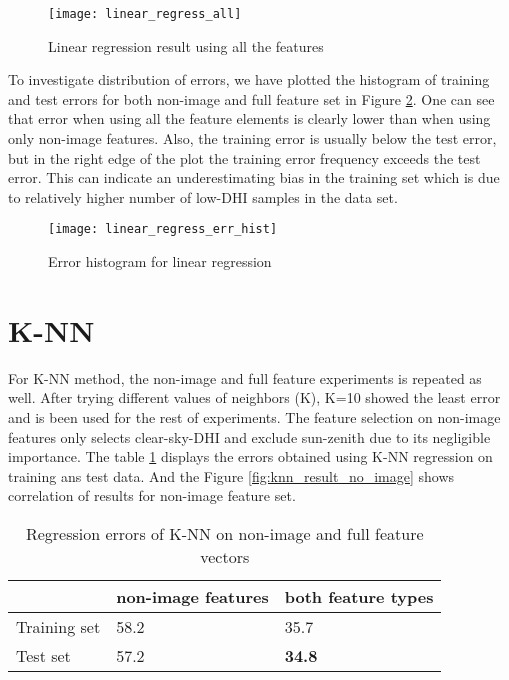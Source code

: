 \begin{figure}[h]
\caption{Linear regression result using all the features}
\label{fig:ln_result_all}
\texttt{[image: linear\_regress\_all]}
\centering
\end{figure}

To investigate distribution of errors, we have plotted the histogram of training and test errors for both non-image and full feature set in Figure \ref{fig:ln_result_hist}. One can see that error when using all the feature elements is clearly lower than when using only non-image features. Also, the training error is usually below the test error, but in the right edge of the plot the training error frequency exceeds the test error. This can indicate an underestimating bias in the training set which is due to relatively higher number of low-DHI samples in the data set.

\begin{figure}[h]
\caption{Error histogram for linear regression}
\label{fig:ln_result_hist}
\texttt{[image: linear\_regress\_err\_hist]}
\centering
\end{figure}

\section{K-NN}
For K-NN method, the non-image and full feature experiments is repeated as well. After trying different values of neighbors (K), K=10 showed the least error and is been used for the rest of experiments. The feature selection on non-image features only selects clear-sky-DHI and exclude sun-zenith due to its negligible importance. The table \ref{table:rmse_knn} displays the errors obtained using K-NN regression on training ans test data. And the Figure \ref{fig:knn_result_no_image} shows correlation of results for non-image feature set.

\begin{table}[h!]
\centering
\begin{tabular}{ |p{2.5cm}||p{4cm}|p{4cm}|  }
\hline
 &non-image features& both feature types\\
 \hline
 Training set &   58.2  & 35.7 \\
 Test set&   57.2  & \textbf{34.8} \\
 \hline
\end{tabular}
\caption{Regression errors of K-NN on non-image and full feature vectors}
\label{table:rmse_knn}
\end{table}

